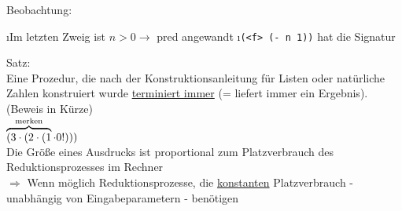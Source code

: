 Beobachtung:\\
\begin{enumerate}[-]
\i Im letzten Zweig ist $n > 0 \rightarrow$ pred angewandt
\i \lstinline!(<f> (- n 1))! hat die Signatur \argt{}
\end{enumerate}
Satz:\\
Eine Prozedur, die nach der Konstruktionsanleitung für Listen oder natürliche Zahlen konstruiert wurde \uline{terminiert immer} (= liefert immer ein Ergebnis).\\
(Beweis in Kürze)\\
$\overbrace{(3 \cdot (2 \cdot (1}^{\text{merken}} \cdot 0!)))$\\
Die Grö\ss e eines Ausdrucks ist proportional zum Platzverbrauch des Reduktionsprozesses im Rechner\\
$\Rightarrow$ Wenn möglich Reduktionsprozesse, die \uline{konstanten} Platzverbrauch - unabhängig von Eingabeparametern - benötigen